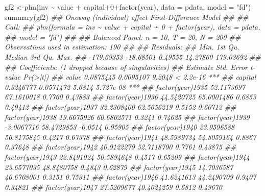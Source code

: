 \documentclass[
  letterpaper,
  xelatex,
  ja=standard, xelatex]{bxjsbook}
\newenvironment{Shaded}{\begin{snugshade}}{\end{snugshade}}
\newcommand{\AttributeTok}[1]{\textcolor[rgb]{0.40,0.45,0.13}{#1}}
\newcommand{\DecValTok}[1]{\textcolor[rgb]{0.68,0.00,0.00}{#1}}
\newcommand{\DocumentationTok}[1]{\textcolor[rgb]{0.37,0.37,0.37}{\textit{#1}}}
\newcommand{\FunctionTok}[1]{\textcolor[rgb]{0.28,0.35,0.67}{#1}}
\newcommand{\NormalTok}[1]{\textcolor[rgb]{0.00,0.23,0.31}{#1}}
\newcommand{\OtherTok}[1]{\textcolor[rgb]{0.00,0.23,0.31}{#1}}
\newcommand{\SpecialCharTok}[1]{\textcolor[rgb]{0.37,0.37,0.37}{#1}}
\newcommand{\StringTok}[1]{\textcolor[rgb]{0.13,0.47,0.30}{#1}}
\begin{document}
\begin{Shaded}
\begin{Highlighting}[]
\NormalTok{gf2 }\OtherTok{\textless{}{-}}\FunctionTok{plm}\NormalTok{(inv }\SpecialCharTok{\textasciitilde{}}\NormalTok{ value }\SpecialCharTok{+}\NormalTok{ capital}\SpecialCharTok{+}\DecValTok{0}\SpecialCharTok{+}\FunctionTok{factor}\NormalTok{(year), }\AttributeTok{data =}\NormalTok{ pdata, }\AttributeTok{model =} \StringTok{"fd"}\NormalTok{)}
\FunctionTok{summary}\NormalTok{(gf2)}
\DocumentationTok{\#\# Oneway (individual) effect First{-}Difference Model}
\DocumentationTok{\#\# }
\DocumentationTok{\#\# Call:}
\DocumentationTok{\#\# plm(formula = inv \textasciitilde{} value + capital + 0 + factor(year), data = pdata, }
\DocumentationTok{\#\#     model = "fd")}
\DocumentationTok{\#\# }
\DocumentationTok{\#\# Balanced Panel: n = 10, T = 20, N = 200}
\DocumentationTok{\#\# Observations used in estimation: 190}
\DocumentationTok{\#\# }
\DocumentationTok{\#\# Residuals:}
\DocumentationTok{\#\#       Min.    1st Qu.     Median    3rd Qu.       Max. }
\DocumentationTok{\#\# {-}179.69353  {-}18.68501    0.49555   14.27860  179.03692 }
\DocumentationTok{\#\# }
\DocumentationTok{\#\# Coefficients: (1 dropped because of singularities)}
\DocumentationTok{\#\#                    Estimate Std. Error t{-}value  Pr(\textgreater{}|t|)    }
\DocumentationTok{\#\# value             0.0875445  0.0095107  9.2048 \textless{} 2.2e{-}16 ***}
\DocumentationTok{\#\# capital           0.3246777  0.0571472  5.6814 5.727e{-}08 ***}
\DocumentationTok{\#\# factor(year)1935 52.1173697 67.1610018  0.7760   0.43883    }
\DocumentationTok{\#\# factor(year)1936 44.5420725 65.0001486  0.6853   0.49412    }
\DocumentationTok{\#\# factor(year)1937 32.2308400 62.5656219  0.5152   0.60712    }
\DocumentationTok{\#\# factor(year)1938 19.6675926 60.6802571  0.3241   0.74625    }
\DocumentationTok{\#\# factor(year)1939 {-}3.0067716 58.4729853 {-}0.0514   0.95905    }
\DocumentationTok{\#\# factor(year)1940 23.9596588 56.8175845  0.4217   0.67378    }
\DocumentationTok{\#\# factor(year)1941 48.5989734 54.8059164  0.8867   0.37648    }
\DocumentationTok{\#\# factor(year)1942 40.9122279 52.7118790  0.7761   0.43875    }
\DocumentationTok{\#\# factor(year)1943 22.8491024 50.5894648  0.4517   0.65209    }
\DocumentationTok{\#\# factor(year)1944 23.6577035 48.8480758  0.4843   0.62879    }
\DocumentationTok{\#\# factor(year)1945 14.7036587 46.6708001  0.3151   0.75311    }
\DocumentationTok{\#\# factor(year)1946 41.6241613 44.2490709  0.9407   0.34821    }
\DocumentationTok{\#\# factor(year)1947 27.5209677 40.4024259  0.6812   0.49670    }

\end{Highlighting}
\end{Shaded}
\end{document}
